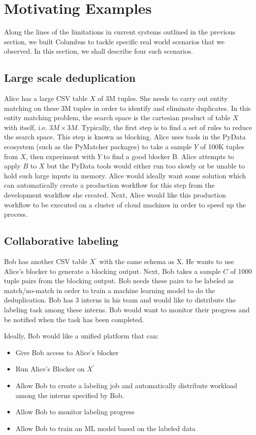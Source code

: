 \section{Motivating Examples}

Along the lines of the limitations in current systems outlined in the previous section, we built Columbus to tackle
specific real world scenarios that we observed. In this section, we shall describe four such
scenarios. 

\subsection{Large scale deduplication}
Alice has a large CSV table $X$ of 3M tuples. She needs to carry out entity matching on these 3M
tuples in order to identify and eliminate duplicates. In this entity matching problem, the search
space is the cartesian product of table $X$ with itself, i.e. $3M \times 3M$. Typically, the first 
step is to find a set of rules to reduce the search space. This step is known as blocking. Alice 
uses tools in the PyData ecosystem (such as the PyMatcher packages) to take a sample $Y$ of 100K 
tuples from $X$, then experiment with $Y$ to find a good blocker B. Alice attempts to apply $B$ to $X$
but the PyData tools would either run too slowly or be unable to hold such large inputs in memory.
Alice would ideally want some solution which can automatically create a production workflow for 
this step from the development workflow she created. Next, Alice would like this production 
workflow to be executed on a cluster of cloud machines in order to speed up the process.

\subsection{Collaborative labeling}
Bob has another CSV table $X^\prime$ with the same schema as X. He wants to use Alice's blocker to
generate a blocking output. Next, Bob takes a sample $C$ of 1000 tuple pairs from the blocking 
output. Bob needs these pairs to be labeled as match/no-match in order to train a machine learning
model to do the deduplication. Bob has 3 interns in his team and would like to distribute the 
labeling task among these interns. Bob would want to monitor their progress and be notified when
the task has been completed.

Ideally, Bob would like a unified platform that can:
\begin{itemize}
  \item Give Bob access to Alice's blocker
  \item Run Alice's Blocker on $X^\prime$
  \item Allow Bob to create a labeling job and automatically distribute workload among the 
    interns specified by Bob.
  \item Allow Bob to monitor labeling progress
  \item Allow Bob to train an ML model based on the labeled data
\end{itemize}
  

